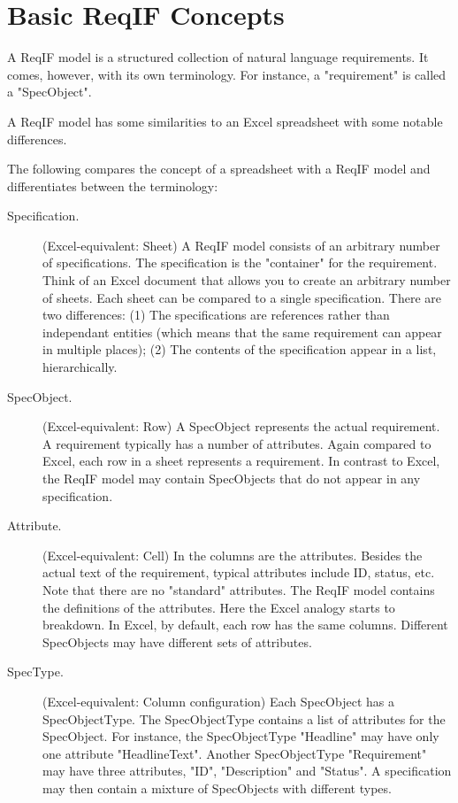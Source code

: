 \section{Basic ReqIF Concepts}

A ReqIF model is a structured collection of natural language requirements.  It comes, however, with its own terminology.  For instance, a "requirement" is called a "SpecObject".

A ReqIF model has some similarities to an Excel spreadsheet with some notable differences.

The following compares the concept of a spreadsheet with a ReqIF model and differentiates between the terminology:

\begin{description}
  \item[Specification.] (Excel-equivalent: Sheet) A ReqIF model
consists of an arbitrary number of specifications.  The specification is
the "container" for the requirement.  Think of an Excel document that
allows you to create an arbitrary number of sheets.  Each sheet can be compared to a single specification.  There are two differences: (1) The specifications are references rather than independant entities (which means that the same requirement can appear in multiple places); (2) The contents of the specification appear in a list, hierarchically.

  \item[SpecObject.] (Excel-equivalent: Row) A SpecObject represents the actual
requirement.  A requirement typically has a number of attributes.  Again
compared to Excel, each row in a sheet represents a requirement.  In
contrast to Excel, the ReqIF model may contain SpecObjects that do not
appear in any specification.

  \item[Attribute.] (Excel-equivalent: Cell) In the columns are the attributes.  
Besides the actual text of the requirement, typical attributes include ID, status, etc.  
Note that there are no "standard" attributes.  The ReqIF model contains the definitions
of the attributes.  Here the Excel analogy starts to breakdown.  In
Excel, by default, each row has the same columns.  Different SpecObjects may have
different sets of attributes.

  \item[SpecType.] (Excel-equivalent: Column configuration) Each SpecObject
has a SpecObjectType.  The SpecObjectType contains a list of attributes
for the SpecObject.  For instance, the SpecObjectType "Headline" may
have only one attribute "HeadlineText".  Another SpecObjectType
"Requirement" may have three attributes, "ID", "Description" and
"Status".  A specification may then contain a mixture of SpecObjects
with different types.

\end{description}


